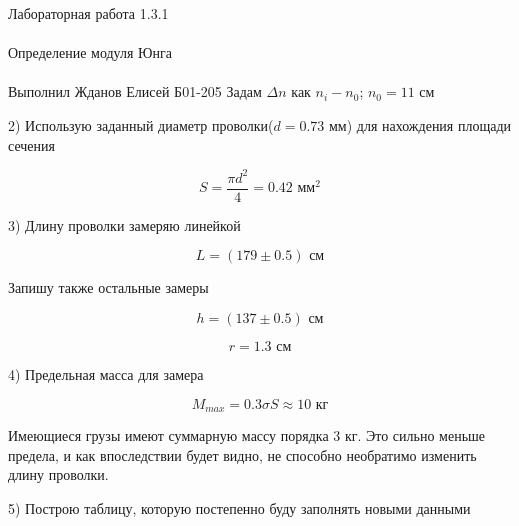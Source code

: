 \documentclass{astroedu-lab}
\begin{document}
\begin{problem}{\huge Лабораторная работа 1.3.1\\\\Определение модуля Юнга\\\\Выполнил Жданов Елисей Б01-205}
Задам $\Delta n$ как $n_i - n_0$; $n_0 = 11$ см

2) Использую заданный диаметр проволки($d = 0.73$ мм) для нахождения площади сечения

\begin{equation}
	S = \frac{\pi d^2}{4} = 0.42 \text{ мм}^2
\end{equation}

3) Длину проволки замеряю линейкой

\begin{equation}
	L = (179 \pm 0.5) \text{ см}
\end{equation}

Запишу также остальные замеры

\begin{equation}
	h = (137 \pm 0.5) \text{ см}
\end{equation}

\begin{equation}
	r = 1.3 \text{ см}
\end{equation}

4) Предельная масса для замера

\begin{equation}
	M_{max} = 0.3 \sigma S \approx 10 \text{ кг}
\end{equation}

Имеющиеся грузы имеют суммарную массу порядка 3 кг. Это сильно меньше предела, и как впоследствии будет видно, не способно необратимо изменить длину проволки.

5) Построю таблицу, которую постепенно буду заполнять новыми данными


\end{problem}
\end{document}
